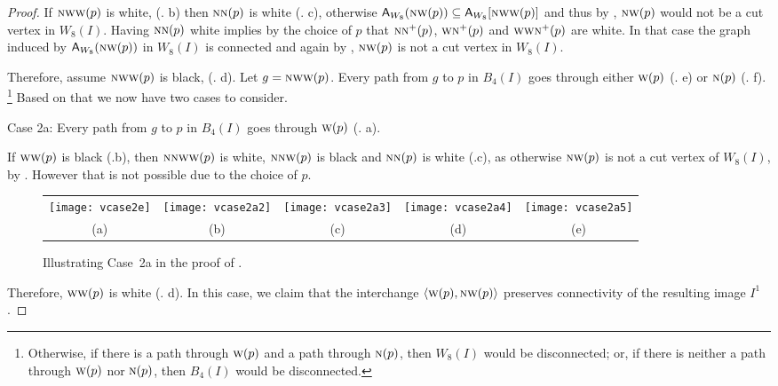 \documentclass[lotsofwhite,charterfonts]{patmorin}
\newcommand{\N}{\textsc{n}}
\newcommand{\W}{\textsc{w}}
\newcommand{\NW}{\textsc{nw}}
\newcommand{\ic}[2]{\langle #1,#2 \rangle}
\newcommand{\A}[2]{\ensuremath{\protect\textup{\textsf{A}}_{#2}(#1)}}
\newcommand{\AC}[2]{\ensuremath{\protect\textup{\textsf{A}}_{#2}[#1]}}
\newcommand{\se}{\ensuremath{\subseteq}}
\begin{document}
\begin{proof}
If $\NW\W(p)$ is white, (. b) then $\N\N(p)$ is white (. c), otherwise $\A{\NW(p)}{W_8}\se \AC{\NW\W(p)}{W_8}$ and thus by , $\NW(p)$ would not be a cut vertex in $W_8(I)$. Having $\N\N(p)$ white implies by the choice of $p$ that $\N\N^+(p)$, $\W\N^+(p)$ and $\W\W\N^+(p)$ are white. In that case the graph induced by \A{\NW(p)}{W_8} in $W_8(I)$ is connected and again by , $\NW(p)$ is not a cut vertex in $W_8(I)$.


Therefore, assume $\NW\W(p)$ is black, (. d). Let $g=\NW\W(p)$. Every path from $g$ to $p$ in $B_4(I)$ goes through  either $\W(p)$  (. e) or $\N(p)$  (. f). \footnote{Otherwise, if there is a path through $\W(p)$ and a path through $\N(p)$, then $W_8(I)$ would be disconnected; or, if there is neither a path through $\W(p)$ nor $\N(p)$, then $B_4(I)$ would be disconnected.} Based on that we now have two cases to consider.

\noindent Case 2a: Every path from $g$ to $p$ in $B_4(I)$ goes through $\W(p)$ (. a). 

If $\W\W(p)$ is black (.b), then $\N\N\W\W(p)$ is white, $\N\N\W(p)$ is black and  $\N\N(p)$ is white (.c), as otherwise $\NW(p)$ is not a cut vertex of $W_8(I)$, by . However that is not possible due to the choice of $p$.

\begin{figure}[htbp]
\begin{center}
\begin{tabular}{ccccc}
\texttt{[image: vcase2e]} & 
\texttt{[image: vcase2a2]} & 
\texttt{[image: vcase2a3]} & 
\texttt{[image: vcase2a4]} &
\texttt{[image: vcase2a5]}
\\
(a) & (b) & (c) & (d) & (e)
\end{tabular}
\end{center}
\caption{Illustrating Case~2a in the proof of .}
\end{figure}

Therefore,  $\W\W(p)$ is white (. d). In this case, we claim that the interchange $\ic{\W(p)}{\NW(p)}$ preserves connectivity of the resulting image $I^1$. 



\end{proof}
\end{document}
